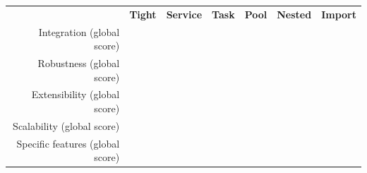 \documentclass[preprint,3p,twocolumn]{elsarticle}
\begin{document}
\begin{table}
\footnotesize
\centering
\begin{tabular}{rcccccc}
                                    & \textbf{Tight}
                                    & \textbf{Service}
                                    & \textbf{Task}
                                    & \textbf{Pool}
                                    & \textbf{Nested}
                                    & \textbf{Import} \\
  Integration (global score)    &
                                    \cellcolor[HTML]{99FF99}{0.00}
                                    & \cellcolor[HTML]{99E899}{0.22}
                                    & \cellcolor[HTML]{99FF99}{0.00}
                                    & \cellcolor[HTML]{99D299}{0.44}
                                    & \cellcolor[HTML]{999999}{1.00}
                                      & \cellcolor[HTML]{99DD99}{0.33}\\
Robustness (global score) &
                                \cellcolor[HTML]{99F099}{0.14}
                                    & \cellcolor[HTML]{99D399}{0.43}
                                    & \cellcolor[HTML]{99FF99}{0.00}
                                    & \cellcolor[HTML]{99B699}{0.71}
                                    & \cellcolor[HTML]{999999}{1.00}
                                    & \cellcolor[HTML]{99D399}{0.43}\\
  Extensibility (global score)  & \cellcolor[HTML]{99D299}{0.44}
                                     & \cellcolor[HTML]{99D299}{0.44}
                                     & \cellcolor[HTML]{99FF99}{0.00}
                                     & \cellcolor[HTML]{99E899}{0.22}
                                     & \cellcolor[HTML]{999999}{1.00}
                                     & \cellcolor[HTML]{99E899}{0.22}\\
Scalability (global score)  & \cellcolor[HTML]{999999}{1.00}
                                     & \cellcolor[HTML]{99CC99}{0.50}
                                     & \cellcolor[HTML]{99CC99}{0.50}
                                     & \cellcolor[HTML]{99FF99}{0.00}
                                     & \cellcolor[HTML]{99CC99}{0.50}
                                     & \cellcolor[HTML]{99CC99}{0.50}\\
Specific features (global score) & \cellcolor[HTML]{99CC99}{0.50}
                                     & \cellcolor[HTML]{99CC99}{0.50}
                                     & \cellcolor[HTML]{999999}{1.00}
                                     & \cellcolor[HTML]{99CC99}{0.50}

\end{tabular}
\end{table}
\end{document}
